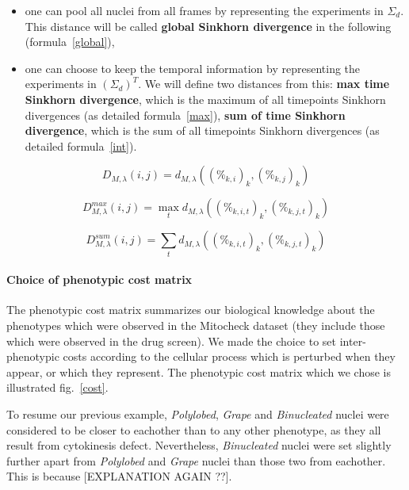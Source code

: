 \begin{itemize}
\item one can pool all nuclei from all frames by representing the experiments in $\Sigma_d$. This distance will be called \textbf{global Sinkhorn divergence} in the following (formula~\ref{global}),
\item one can choose to keep the temporal information by representing the experiments in $\left(\Sigma_d\right) ^T$. We will define two distances from this:
\subitem \textbf{max time Sinkhorn divergence}, which is the maximum of all timepoints Sinkhorn divergences (as detailed formula~\ref{max}),
\subitem \textbf{sum of time Sinkhorn divergence}, which is the sum of all timepoints Sinkhorn divergences (as detailed formula~\ref{int}).
\end{itemize}
\begin{equation}
D_{M,\lambda}(i,j)= d_{M,\lambda}((\%_{k,i})_{k},(\%_{k,j})_{k})
\label{global}
\end{equation}

\begin{equation}
D_{M,\lambda}^{max}(i,j)= \max_t d_{M,\lambda}((\%_{k,i,t})_{k},(\%_{k,j,t})_{k})
\label{max}
\end{equation}

\begin{equation}
D_{M,\lambda}^{sum}(i,j)= \sum_t d_{M,\lambda}((\%_{k,i,t})_{k},(\%_{k,j,t})_{k})
\label{int}
\end{equation}

\paragraph{Choice of phenotypic cost matrix}
The phenotypic cost matrix summarizes our biological knowledge about the phenotypes which were observed in the Mitocheck dataset (they include those which were observed in the drug screen). We made the choice to set inter-phenotypic costs according to the cellular process which is perturbed when they appear, or which they represent. The phenotypic cost matrix which we chose is illustrated fig.~\ref{cost}.

To resume our previous example, \textit{Polylobed}, \textit{Grape} and \textit{Binucleated} nuclei were considered to be closer to eachother than to any other phenotype, as they all result from cytokinesis defect. Nevertheless, \textit{Binucleated} nuclei were set slightly further apart from \textit{Polylobed} and \textit{Grape} nuclei than those two from eachother. This is because [EXPLANATION AGAIN ??].

